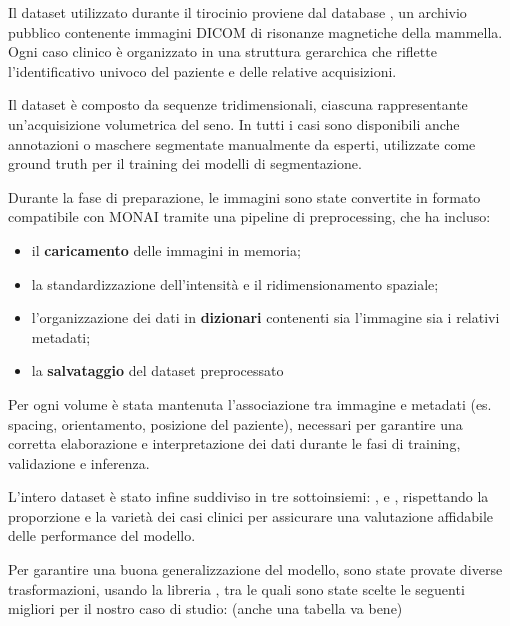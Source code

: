 \documentclass[minted, draw]{../tex/hebdomon}
\begin{document}

Il dataset utilizzato durante il tirocinio proviene dal database , un archivio pubblico contenente immagini DICOM di risonanze magnetiche della mammella. Ogni caso clinico è organizzato in una struttura gerarchica che riflette l'identificativo univoco del paziente e delle relative acquisizioni.

Il dataset è composto da sequenze  tridimensionali, ciascuna rappresentante un'acquisizione volumetrica del seno. In tutti i casi sono disponibili anche annotazioni o maschere segmentate manualmente da esperti, utilizzate come ground truth per il training dei modelli di segmentazione.

Durante la fase di preparazione, le immagini sono state convertite in formato compatibile con MONAI tramite una pipeline di preprocessing, che ha incluso:
\begin{itemize}
    \item il \textbf{caricamento} delle immagini in memoria;
    \item la standardizzazione dell'intensità e il ridimensionamento spaziale;
    \item l'organizzazione dei dati in \textbf{dizionari} contenenti sia l'immagine sia i relativi metadati;
    \item la \textbf{salvataggio} del dataset preprocessato 
\end{itemize}

Per ogni volume è stata mantenuta l'associazione tra immagine e metadati (es. spacing, orientamento, posizione del paziente), necessari per garantire una corretta elaborazione e interpretazione dei dati durante le fasi di training, validazione e inferenza.

L'intero dataset è stato infine suddiviso in tre sottoinsiemi: ,  e , rispettando la proporzione e la varietà dei casi clinici per assicurare una valutazione affidabile delle performance del modello.




Per garantire una buona generalizzazione del modello, sono state provate diverse trasformazioni, usando la libreria , tra le quali sono state scelte le seguenti migliori per il nostro caso di studio: (anche una tabella va bene)
\end{document}
